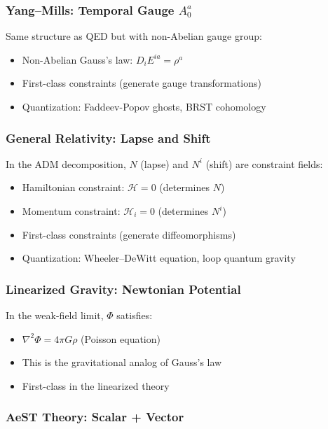 \documentclass[11pt,a4paper]{article}
\begin{document}
\subsubsection{Yang--Mills: Temporal Gauge $A_0^a$}

Same structure as QED but with non-Abelian gauge group:
\begin{itemize}
\item Non-Abelian Gauss's law: $D_i E^{ia} = \rho^a$
\item First-class constraints (generate gauge transformations)
\item Quantization: Faddeev-Popov ghosts, BRST cohomology
\end{itemize}

\subsubsection{General Relativity: Lapse and Shift}

In the ADM decomposition, $N$ (lapse) and $N^i$ (shift) are constraint fields:
\begin{itemize}
\item Hamiltonian constraint: $\mathcal{H} = 0$ (determines $N$)
\item Momentum constraint: $\mathcal{H}_i = 0$ (determines $N^i$)
\item First-class constraints (generate diffeomorphisms)
\item Quantization: Wheeler--DeWitt equation, loop quantum gravity
\end{itemize}

\subsubsection{Linearized Gravity: Newtonian Potential}

In the weak-field limit, $\Phi$ satisfies:
\begin{itemize}
\item $\nabla^2\Phi = 4\pi G\rho$ (Poisson equation)
\item This is the gravitational analog of Gauss's law
\item First-class in the linearized theory
\end{itemize}

\subsubsection{AeST Theory: Scalar + Vector}
\end{document}
